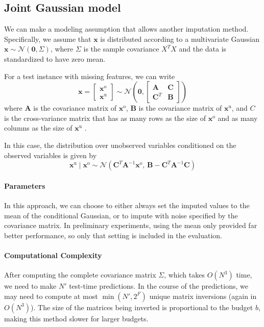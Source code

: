 \subsection{Joint Gaussian model}

We can make a modeling assumption that allows another imputation method.
Specifically, we assume that $\mathbf{x}$ is distributed according to a multivariate Gaussian $\mathbf{x} \sim \mathcal{N}(\mathbf{0}, \Sigma)$, where $\Sigma$ is the sample covariance $X^T X$ and the data is standardized to have zero mean.

For a test instance with missing features, we can write
\begin{equation}
\mathbf{x} = \begin{bmatrix} \mathbf{x}^\text{o}\\  \mathbf{x}^\text{u} \end{bmatrix} \sim \mathcal{N} \left( \mathbf{0}, \begin{bmatrix} \mathbf{A} & \mathbf{C}\\ \mathbf{C}^T & \mathbf{B} \end{bmatrix} \right)
\end{equation}
where $\mathbf{A}$ is the covariance matrix of $\mathbf{x}^\text{o}$, $\mathbf{B}$ is the covariance matrix of $\mathbf{x}^\text{u}$, and $C$ is the cross-variance matrix that has as many rows as the size of $\mathbf{x}^\text{o}$ and as many columns as the size of $\mathbf{x}^\text{u}$ \cite{Roweis-gaussian-identities}.

In this case, the distribution over unobserved variables conditioned on the observed variables is given by
\begin{equation}
\mathbf{x}^\text{u} \mid \mathbf{x}^\text{o} \sim \mathcal{N} \left( \mathbf{C}^T \mathbf{A}^{-1} \mathbf{x}^\text{o},\, \mathbf{B} - \mathbf{C}^T \mathbf{A}^{-1} \mathbf{C} \right)
\end{equation}

\paragraph{Parameters}
In this approach, we can choose to either always set the imputed values to the mean of the conditional Gaussian, or to impute with noise specified by the covariance matrix.
In preliminary experiments, using the mean only provided far better performance, so only that setting is included in the evaluation.

\paragraph{Computational Complexity}
After computing the complete covariance matrix $\Sigma$, which takes $O(N^3)$ time, we need to make $N'$ test-time predictions.
In the course of the predictions, we may need to compute at most $\min(N', 2^F)$ unique matrix inversions (again in $O(N^3)$).
The size of the matrices being inverted is proportional to the budget $b$, making this method slower for larger budgets.

